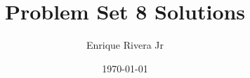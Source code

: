 \documentclass[12pt]{article}
\begin{document}
\title{Problem Set 8 Solutions}
\author{Enrique Rivera Jr}
\date{\today}

\maketitle
\end{document}
